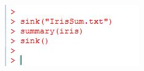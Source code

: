 \documentclass{beamer}
\begin{document}
 	\begin{frame}
 		\begin{figure}
 			\centering
 			\includegraphics[width=1.2\linewidth]{images/sinkiris}
 		\end{figure}
 		
 	\end{frame}

 	
\end{document}
